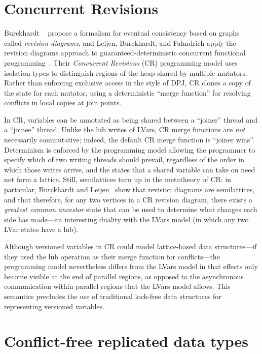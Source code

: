 \section{Concurrent Revisions}

Burckhardt \etal~\cite{eventually-consistent-transactions} propose a
formalism for eventual consistency based on graphs called
\emph{revision diagrams}, and Leijen, Burckhardt, and Fahndrich apply
the revision diagrams approach to guaranteed-deterministic concurrent
functional programming~\cite{concurrent-revisions-haskell11}.  Their
\emph{Concurrent Revisions} (CR) programming model uses isolation
types to distinguish regions of the heap shared by multiple mutators.
Rather than enforcing exclusive access in the style of DPJ, CR clones
a copy of the state for each mutator, using a deterministic ``merge
function'' for resolving conflicts in local copies at join points.

In CR, variables can be annotated as being shared between a ``joiner''
thread and a ``joinee'' thread.  Unlike the lub writes of LVars, CR
merge functions are \emph{not} necessarily commutative; indeed, the
default CR merge function is ``joiner wins''.  Determinism is enforced
by the programming model allowing the programmer to specify which of
two writing threads should prevail, regardless of the order in which
those writes arrive, and the states that a shared variable can take on
need not form a lattice.  Still, semilattices turn up in the
metatheory of CR: in particular, Burckhardt and
Leijen~\cite{semantics-concurrent-revisions} show that revision
diagrams are semilattices, and that therefore, for any two vertices in
a CR revision diagram, there exists a \emph{greatest common ancestor}
state that can be used to determine what changes each side has
made---an interesting duality with the LVars model (in which any two
LVar states have a lub).

Although versioned variables in CR could model lattice-based data
structures---if they used the lub operation as their merge function
for conflicts---the programming model nevertheless differs from the
LVars model in that effects only become visible at the end of parallel
regions, as opposed to the asynchronous communication within parallel
regions that the LVars model allows.  This semantics precludes the use
of traditional lock-free data structures for representing versioned
variables.

\section{Conflict-free replicated data types}
\ifdefined\JOURNAL

